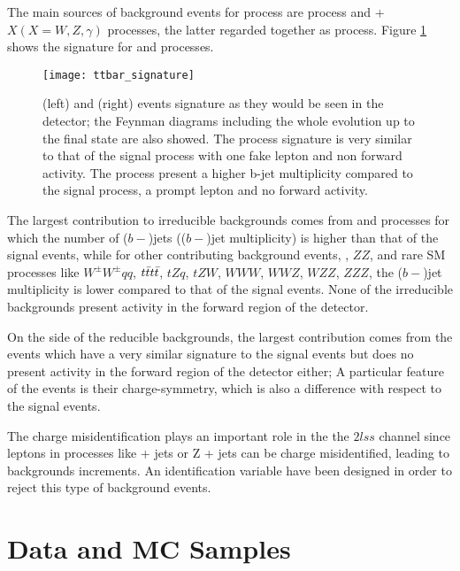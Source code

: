 The main sources of background events for \tHq process are \ttbar process and \ttbar + $X (X=W,Z,\gamma)$ processes, the latter regarded together as \ttV process. Figure \ref{fig:ttbar_sign} shows the signature for \ttbar and \ttW processes.     

\begin{figure}[!htb]
\centering
\texttt{[image: ttbar\_signature]}
\caption[\ttbar and \ttW events signature]{\ttbar(left) and \ttW(right) events signature as they would be seen in the detector; the Feynman diagrams including the whole evolution up to the final state are also showed. The \ttbar process signature is very similar to that of the signal process with one fake lepton and non forward activity. The \ttW process present a higher b-jet multiplicity compared to the signal process, a prompt lepton and no forward activity.}
\label{fig:ttbar_sign}
\end{figure}

The largest contribution to irreducible backgrounds comes from \ttW and \ttZ processes for which the number of ($b-$)jets (($b-$)jet multiplicity) is higher than that of the signal events, while for other contributing background events,  \WZ, $ZZ$, and rare SM processes like $W^\pm W^\pm qq$, $t\bar{t}t\bar{t}$, $tZq$, $tZW$, $WWW$, $WWZ$, $WZZ$, $ZZZ$, the ($b-$)jet multiplicity is lower compared to that of the signal events. None of the irreducible backgrounds present activity in the forward region of the detector.

On the side of the reducible backgrounds, the largest contribution comes from the \ttbar events which have a very similar signature to the signal events but does no present activity in the forward region of the detector either; A particular feature of the \ttbar events is their charge-symmetry, which is also a difference with respect to the signal events.

The charge misidentification plays an important role in the the $2lss$ channel since leptons in processes like \ttbar + jets or Z + jets can be charge misidentified, leading to backgrounds increments. An identification variable have been designed in order to reject this type of background events.         

\section{Data and MC Samples} \label{secc:samples}

